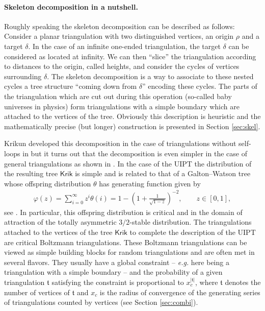 \documentclass[AHL,XML,longabstracts,Unicode,NoSaveZebib]{cedram}
\begin{document}
\paragraph{Skeleton decomposition in a nutshell.} Roughly speaking the skeleton decomposition can be described as follows: Consider a planar triangulation with two distinguished vertices, an origin $\rho$ and a target $\delta$. In the case of an infinite one-ended triangulation, the target $\delta$ can be considered as located at infinity. We can then ``slice'' the triangulation according to distances to the origin, called heights, and consider the cycles of vertices surrounding $\delta$. The skeleton decomposition is a way to associate to these nested cycles a tree structure ``coming down from $\delta$'' encoding these cycles. The parts of the triangulation which are cut out during this operation (so-called baby universes in physics) form triangulations with a simple boundary  which are attached to the vertices of the tree. Obviously this description is heuristic  and the mathematically precise (but longer) construction is presented in Section \ref{sec:skel}.



Krikun developed this decomposition in the case of triangulations without self-loops  in \cite{Kr} but it turns out that the decomposition is even simpler in the case of general triangulations as shown in \cite{CLGfpp}. In the case of the UIPT the distribution of the resulting tree $ \mathsf{Krik}$ is simple and is related to that of a Galton--Watson tree whose  offspring distribution $\theta$ has generating function given by
 \begin{eqnarray} \varphi(z)= \sum_{i=0}^\infty z^i \theta(i) = 1 - \left( 1+ \frac{1}{ \sqrt{1-z}}\right)^{-2}, \qquad z \in [0,1] \label{eq:offspring},  \end{eqnarray}
see \cite{CLGfpp,M}. In particular, this offspring distribution is critical and in the domain of attraction of the totally asymmetric $3/2$-stable distribution. The triangulations attached to the vertices of the tree $ \mathsf{Krik}$ to complete the description of the UIPT are critical Boltzmann triangulations. These Boltzmann triangulations can be viewed as simple building blocks for random triangulations and are often met in several flavors. They usually have a global constraint -- \emph{e.g.} here being a triangulation with a simple boundary -- and the probability of a given triangulation $\mathfrak t$ satisfying the constraint is proportional to $x_c^{|\mathfrak t|}$, where $\mathfrak t$ denotes the number of vertices of $\mathfrak t$ and $x_c$ is the radius of convergence of the generating series of triangulations counted by vertices (see Section \ref{sec:combi}).
\end{document}

